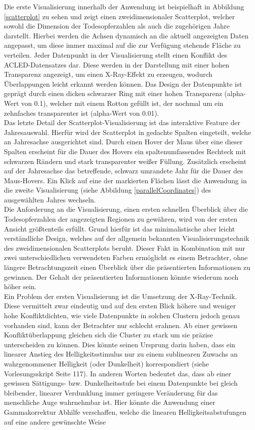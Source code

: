 \documentclass[usegeometry=true]{scrartcl}
\begin{document}
Die erste Visualisierung innerhalb der Anwendung ist beispielhaft in Abbildung \ref{scatterplot} zu sehen und zeigt einen zweidimensionaler Scatterplot, welcher sowohl die Dimension der Todesopferzahlen als auch die zugehörigen Jahre darstellt. Hierbei werden die Achsen dynamisch an die aktuell angezeigten Daten angepasst, um diese immer maximal auf die zur Verfügung stehende Fläche zu verteilen. Jeder Datenpunkt in der Visualisierung stellt einen Konflikt des ACLED-Datensatzes dar. Diese werden in der Darstellung mit einer hohen Transparenz angezeigt, um einen X-Ray-Effekt zu erzeugen, wodurch Überlappungen leicht erkannt werden können. Das Design der Datenpunkte ist geprägt durch einen dicken schwarzer Ring mit einer hohen Transparenz (alpha-Wert von 0.1), welcher mit einem Rotton gefüllt ist, der nochmal um ein zehnfaches transparenter ist (alpha-Wert von 0.01).\\ Das letzte Detail der Scatterplot-Visualisierung ist das interaktive Feature der Jahresauswahl. Hierfür wird der Scatterplot in gedachte Spalten eingeteilt, welche an Jahresachse ausgerichtet sind. Durch einen Hover der Maus über eine dieser Spalten erscheint für die Dauer des Hovers ein spaltenumfassendes Rechteck mit schwarzen Rändern und stark transparenter weißer Füllung. Zusätzlich erscheint auf der Jahresachse das betreffende, schwarz umrandete Jahr für die Dauer des Maus-Hovers. Ein Klick auf eine der markierten Flächen lässt die Anwendung in die zweite Visualisierung (siehe Abbildung \ref{parallelCoordinates}) des ausgewählten Jahres wechseln.\\ Die Anforderung an die Visualisierung, einen ersten schnellen Überblick über die Todesopferzahlen der angezeigten Regionen zu gewähren, wird von der ersten Ansicht größtenteils erfüllt. Grund hierfür ist das minimalistische aber leicht verständliche Design, welches auf der allgemein bekannten Visualisierungstechnik des zweidimensionalen Scatterplots beruht. Dieser Fakt in Kombination mit nur zwei unterschiedlichen verwendeten Farben ermöglicht es einem Betrachter, ohne längere Betrachtungszeit einen Überblick über die präsentierten Informationen zu gewinnen. Der Gehalt der präsentierten Informationen könnte wiederum noch höher sein.\\ Ein Problem der ersten Visualisierung ist die Umsetzung der X-Ray-Technik. Diese vermittelt zwar eindeutig und auf den ersten Blick höhere und weniger hohe Konfliktdichten, wie viele Datenpunkte in solchen Clustern jedoch genau vorhanden sind, kann der Betrachter nur schlecht erahnen. Ab einer gewissen Konfliktüberlappung gleichen sich die Cluster zu stark um sie präzise unterscheiden zu können. Dies könnte seinen Ursprung darin haben, dass ein linearer Anstieg des Helligkeitsstimulus nur zu einem sublinearen Zuwachs an wahrgenommener Helligkeit (oder Dunkelheit) korrespondiert (siehe Vorlesungsskript Seite 117). In anderen Worten bedeutet das, dass ab einer gewissen Sättigungs- bzw. \glqq Dunkelheitsstufe\grqq{} bei einem Datenpunkte bei gleich bleibender, linearer Verdunklung immer geringere Veränderung für das menschliche Auge wahrnehmbar ist. Hier könnte die Anwendung einer Gammakorrektur Abhilfe verschaffen, welche die linearen Helligkeitsabstufungen auf eine andere gewünschte Weise 
\end{document}
